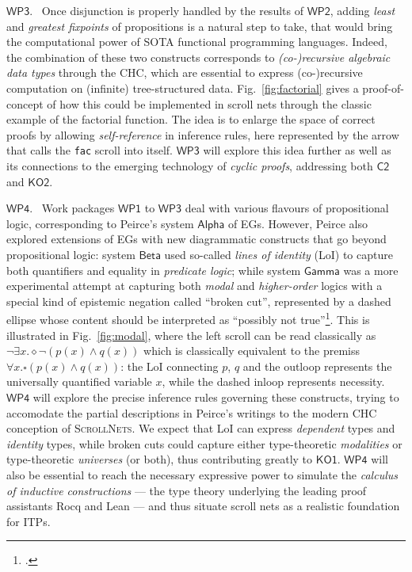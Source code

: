 \documentclass[11pt]{msca-pf}
\newcommand{\proj}{\small\textsc{ScrollNets}}
\newcommand{\CH}[1]{$\mathsf{C#1}$}
\newcommand{\KO}[1]{$\mathsf{KO#1}$}
\newcommand{\WP}[1]{$\mathsf{WP#1}$}
\begin{document}
    \WP{3}.~ Once disjunction is properly handled by the results of \WP{2}, adding \emph{least} and
    \emph{greatest fixpoints} of propositions is a natural step to take, that would bring the
    computational power of SOTA functional programming languages. Indeed, the combination of these
    two constructs corresponds to \emph{(co-)recursive algebraic data types} through the CHC, which
    are essential to express (co-)recursive computation on (infinite) tree-structured data.
    Fig.~\ref{fig:factorial} gives a proof-of-concept of how this could be implemented in scroll
    nets through the classic example of the factorial function. The idea is to enlarge the space of
    correct proofs by allowing \emph{self-reference} in inference rules, here represented by the
    arrow that calls the \texttt{fac} scroll into itself. \WP{3} will explore this idea further as
    well as its connections to the emerging technology of \emph{cyclic proofs}, addressing both
    \CH{2} and \KO{2}. 

    \WP{4}.~ Work packages \WP{1} to \WP{3} deal with various flavours of propositional logic,
    corresponding to Peirce's system $\mathsf{Alpha}$ of EGs. However, Peirce also explored
    extensions of EGs with new diagrammatic constructs that go beyond propositional logic: system
    $\mathsf{Beta}$ used so-called \emph{lines of identity} (LoI) to capture both quantifiers and
    equality in \emph{predicate logic}; while system $\mathsf{Gamma}$ was a more experimental
    attempt at capturing both \emph{modal} and \emph{higher-order} logics with a special kind of
    epistemic negation called ``broken cut'', represented by a dashed ellipse whose content should
    be interpreted as ``possibly not true''\footcite{maGammaGraphCalculi2018}. This is illustrated
    in Fig.~\ref{fig:modal}, where the left scroll can be read classically as $\neg \exists x.
    \diamond \neg (p(x) \land q(x))$ which is classically equivalent to the premiss $\forall x.
    \square (p(x) \land q(x))$: the LoI connecting $p$, $q$ and the outloop represents the
    universally quantified variable $x$, while the dashed inloop represents necessity. \WP{4} will
    explore the precise inference rules governing these constructs, trying to accomodate the partial
    descriptions in Peirce's writings to the modern CHC conception of {\proj}. We expect that LoI
    can express \emph{dependent} types and \emph{identity} types, while broken cuts could capture
    either type-theoretic \emph{modalities} or type-theoretic \emph{universes} (or both), thus
    contributing greatly to \KO{1}. \WP{4} will also be essential to reach the necessary expressive
    power to simulate the \emph{calculus of inductive constructions} --- the type theory underlying
    the leading proof assistants Rocq and Lean --- and thus situate scroll nets as a realistic
    foundation for ITPs.
\end{document}
